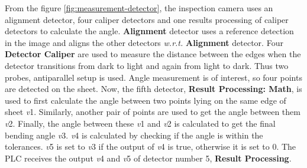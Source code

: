 From the figure \ref{fig:measurement-detector}, the inspection camera uses an alignment detector, four caliper detectors and one results processing of caliper detectors to calculate the angle.
\textbf{Alignment} detector uses a reference detection in the image and aligns the other detectors \textit{w.r.t.} \textbf{Alignment} detector. 
Four \textbf{Detector Caliper} are used to measure the distance between the edges when the detector transitions from dark to light and again from light to dark. Thus two probes, antiparallel setup is used. Angle measurement is of interest, so four points are detected on the sheet. 
Now, the fifth detector, \textbf{Result Processing: Math}, is used to first calculate the angle between two points lying on the same edge of sheet \textit{v}1. Similarly, another pair of points are used to get the angle between them \textit{v}2. Finally, the angle between these \textit{v}1 and \textit{v}2 is calculated to get the final bending angle \textit{v}3. \textit{v}4 is calculated by checking if the angle is within the tolerances. \textit{v}5 is set to \textit{v}3 if the output of \textit{v}4 is true, otherwise it is set to 0. The PLC receives the output \textit{v}4 and \textit{v}5 of detector number 5, \textbf{Result Processing}.

